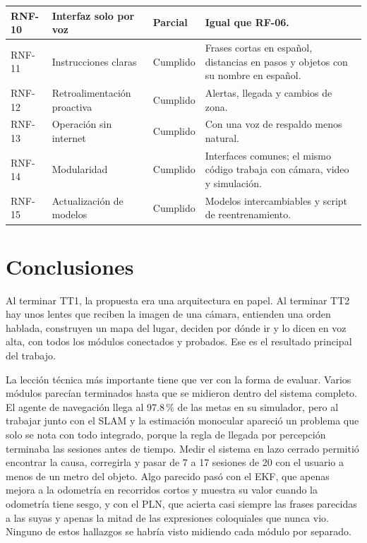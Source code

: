 \begin{longtable}{|p{1.6cm}|p{4.6cm}|p{1.9cm}|p{6.4cm}|}
\hline
RNF-10 & Interfaz solo por voz & Parcial & Igual que RF-06. \\
\hline
RNF-11 & Instrucciones claras & Cumplido & Frases cortas en español, distancias en
pasos y objetos con su nombre en español. \\
\hline
RNF-12 & Retroalimentación proactiva & Cumplido & Alertas, llegada y cambios de
zona. \\
\hline
RNF-13 & Operación sin internet & Cumplido & Con una voz de respaldo menos
natural. \\
\hline
RNF-14 & Modularidad & Cumplido & Interfaces comunes; el mismo código trabaja con
cámara, video y simulación. \\
\hline
RNF-15 & Actualización de modelos & Cumplido & Modelos intercambiables y script de
reentrenamiento. \\
\hline
\end{longtable}

\section{Conclusiones}

Al terminar TT1, la propuesta era una arquitectura en papel. Al terminar TT2 hay unos
lentes que reciben la imagen de una cámara, entienden una orden hablada, construyen un
mapa del lugar, deciden por dónde ir y lo dicen en voz alta, con todos los módulos
conectados y probados. Ese es el resultado principal del trabajo.

La lección técnica más importante tiene que ver con la forma de evaluar. Varios módulos
parecían terminados hasta que se midieron dentro del sistema completo. El agente de
navegación llega al 97.8\,\% de las metas en su simulador, pero al trabajar junto con el
SLAM y la estimación monocular apareció un problema que solo se nota con todo integrado,
porque la regla de llegada por percepción terminaba las sesiones antes de tiempo. Medir
el sistema en lazo cerrado permitió encontrar la causa, corregirla y pasar de 7 a 17
sesiones de 20 con el usuario a menos de un metro del objeto. Algo parecido pasó con el
EKF, que apenas mejora a la odometría en recorridos cortos y muestra su valor cuando la
odometría tiene sesgo, y con el PLN, que acierta casi siempre las frases parecidas a
las suyas y apenas la mitad de las expresiones coloquiales que nunca vio. Ninguno de estos
hallazgos se habría visto midiendo cada módulo por separado.

